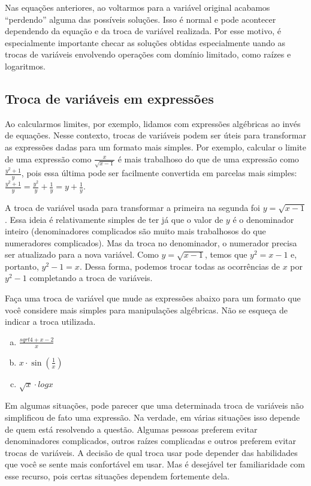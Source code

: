 \documentclass[main_estudante.tex]{subfiles}
\begin{document}
Nas equações anteriores, ao voltarmos para a variável original acabamos ``perdendo'' alguma das possíveis soluções. Isso é normal e pode acontecer dependendo da equação e da troca de variável realizada. Por esse motivo, é especialmente importante checar as soluções obtidas especialmente uando as trocas de variáveis envolvendo operações com domínio limitado, como raízes e logaritmos.

\subsection*{Troca de variáveis em expressões}

Ao calcularmos limites, por exemplo, lidamos com expressões algébricas ao invés de equações. Nesse contexto, trocas de variáveis podem ser úteis para transformar as expressões dadas para um formato mais simples. Por exemplo, calcular o limite de uma expressão como $\frac{x}{\sqrt{x-1}}$ é mais trabalhoso do que de uma expressão como $\frac{y^2+1}{y}$, pois essa última pode ser facilmente convertida em parcelas mais simples: $\frac{y^2+1}{y}=\frac{y^2}{y}+\frac{1}{y}=y+\frac{1}{y}$.

A troca de variável usada para transformar a primeira na segunda foi $y=\sqrt{x-1}$. Essa ideia é relativamente simples de ter já que o valor de $y$ é o denominador inteiro (denominadores complicados são muito mais trabalhosos do que numeradores complicados). Mas da troca no denominador, o numerador precisa ser atualizado para a nova variável. Como $y=\sqrt{x-1}$, temos que $y^2=x-1$ e, portanto, $y^2-1=x$. Dessa forma, podemos trocar todas as ocorrências de $x$ por $y^2-1$ completando a troca de variáveis.

\begin{questao}
Faça uma troca de variável que mude as expressões abaixo para um formato que você considere mais simples para manipulações algébricas. Não se esqueça de indicar a troca utilizada.
\begin{enumerate}[a)]
\item $\frac{sqrt{4+x}-2}{x}$
\item $x \cdot \sin(\frac{1}{x})$
\item $\sqrt{x} \cdot log x$
\end{enumerate}
\end{questao}

Em algumas situações, pode parecer que uma determinada troca de variáveis não simplificou de fato uma expressão. Na verdade, em várias situações isso depende de quem está resolvendo a questão. Algumas pessoas preferem evitar denominadores complicados, outros raízes complicadas e outros preferem evitar trocas de variáveis. A decisão de qual troca usar pode depender das habilidades que você se sente mais confortável em usar. Mas é desejável ter familiaridade com esse recurso, pois certas situações dependem fortemente dela.
\end{document}
